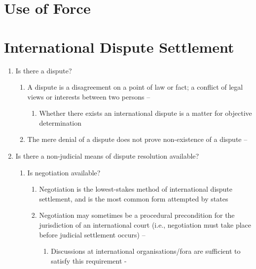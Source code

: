 \section{Use of Force}

\section{International Dispute Settlement}
\begin{enumerate}
    \item Is there a dispute?
    \begin{enumerate}
        \item A dispute is a disagreement on a point of law or fact; a conflict of legal views or interests between two persons -- 
        \begin{enumerate}
            \item Whether there exists an international dispute is a matter for objective determination
        \end{enumerate}
        \item The mere denial of a dispute does not prove non-existence of a dispute -- 
    \end{enumerate}
    \item Is there a non-judicial means of dispute resolution available?
    \begin{enumerate}
        \item Is negotiation available?
        \begin{enumerate}
            \item Negotiation is the lowest-stakes method of international dispute settlement, and is the most common form attempted by states
            \item Negotiation may sometimes be a procedural precondition for the jurisdiction of an international court (i.e., negotiation must take place before judicial settlement occurs) -- 
            \begin{enumerate}
                \item Discussions at international organisations/fora are sufficient to satisfy this requirement - 
            \end{enumerate}
        \end{enumerate}

\end{enumerate}
\end{enumerate}
